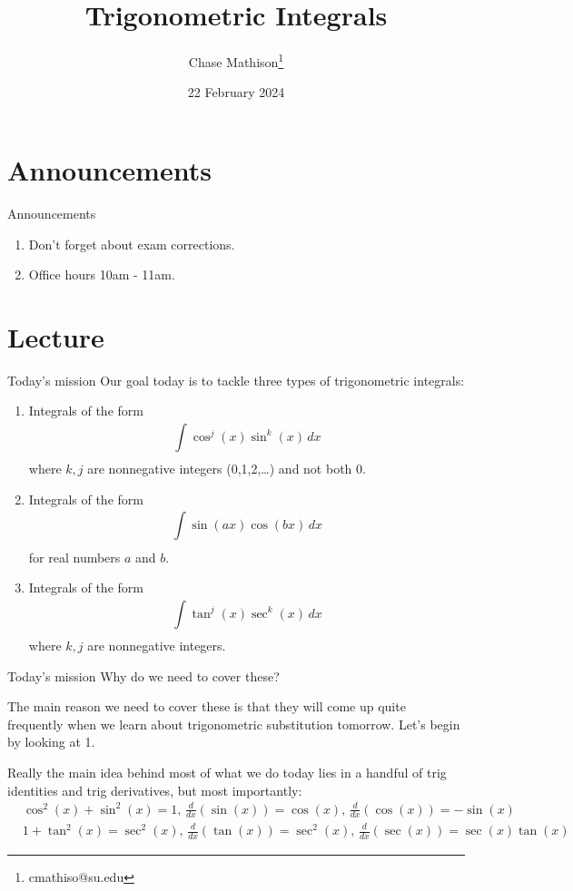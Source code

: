 \documentclass[presentation]{beamer}
\institute[SU]{Shenandoah University}
\author{Chase Mathison\thanks{cmathiso@su.edu}}
\date{22 February 2024}
\title{Trigonometric Integrals}
\begin{document}
\maketitle

\section{Announcements}
\label{sec:org4058208}
\begin{frame}[label={sec:orgf85f111}]{Announcements}
\begin{enumerate}
\item Don't forget about exam corrections.
\item Office hours 10am - 11am.
\end{enumerate}
\end{frame}

\section{Lecture}
\label{sec:orgeb79653}
\begin{frame}[label={sec:org7e4ef83}]{Today's mission}
Our goal today is to tackle three types of trigonometric integrals:
\begin{enumerate}
\item Integrals of the form \[\int\limits_{}^{} \cos^j \left( x \right)
   \sin^k \left( x \right)\,dx \] where \(k,j\) are nonnegative
integers (0,1,2,\ldots{}) and not both 0.
\item Integrals of the form \[\int\limits_{}^{} \sin(ax)\cos(bx)\,dx \]
for real numbers \(a\) and \(b\).
\item Integrals of the form \[\int\limits_{}^{} \tan^j \left( x \right)
   \sec^k \left( x \right)\,dx \] where \(k,j\) are nonnegative
integers.
\end{enumerate}
\end{frame}

\begin{frame}[label={sec:orgb9173a4}]{Today's mission}
Why do we need to cover these?

The main reason we need to cover these is that they will come up quite
frequently when we learn about trigonometric substitution tomorrow.
Let's begin by looking at 1.

Really the main idea behind most of what we do today lies in a handful
of trig identities and trig derivatives, but most importantly:
\begin{align*}
&\cos^2(x) + \sin^2(x) = 1,\,\frac{d}{dx}(\sin(x)) = \cos(x),\,\frac{d}{dx}(\cos(x)) = -\sin(x)\\
&1 + \tan^2 (x) = \sec^2(x),\,\frac{d}{dx}(\tan(x)) = \sec^2(x),\,\frac{d}{dx}(\sec(x)) = \sec(x)\tan(x)
\end{align*}
\end{frame}
\end{document}
